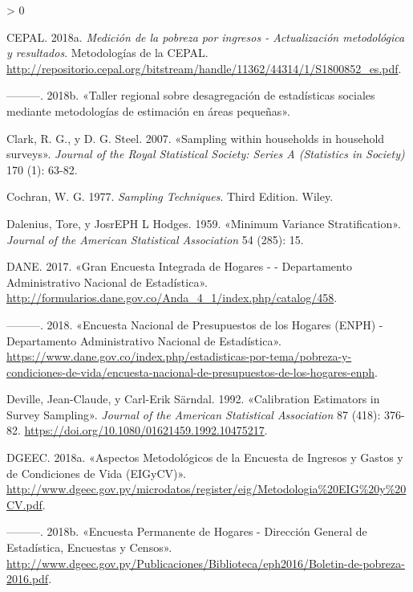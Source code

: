 \documentclass[
  12pt,
  spanish,
]{book}
\newlength{\cslhangindent}
\newenvironment{CSLReferences}[2] %
 {%
  \setlength{\parindent}{0pt}
  \ifodd #1 \everypar{\setlength{\hangindent}{\cslhangindent}}\ignorespaces\fi
  \ifnum #2 > 0
  \setlength{\parskip}{#2\baselineskip}
  \fi
 }%
 {}
\begin{document}
\begin{CSLReferences}{1}{0}
\leavevmode\hypertarget{ref-CEPAL_2018}{}%
CEPAL. 2018a. \emph{Medición de la pobreza por ingresos - Actualización metodológica y resultados}. Metodologías de la CEPAL. \url{http://repositorio.cepal.org/bitstream/handle/11362/44314/1/S1800852_es.pdf}.

\leavevmode\hypertarget{ref-CepalSAe2018}{}%
---------. 2018b. {«Taller regional sobre desagregación de estadísticas sociales mediante metodologías de estimación en áreas pequeñas»}.

\leavevmode\hypertarget{ref-Clark_Steel_2007}{}%
Clark, R. G., y D. G. Steel. 2007. {«Sampling within households in household surveys»}. \emph{Journal of the Royal Statistical Society: Series A (Statistics in Society)} 170 (1): 63-82.

\leavevmode\hypertarget{ref-Cochran_1977}{}%
Cochran, W. G. 1977. \emph{Sampling Techniques}. Third Edition. Wiley.

\leavevmode\hypertarget{ref-Dalenius_Hodges_1959}{}%
Dalenius, Tore, y JosrEPH L Hodges. 1959. {«Minimum Variance Stratification»}. \emph{Journal of the American Statistical Association} 54 (285): 15.

\leavevmode\hypertarget{ref-DANE-COL_2017}{}%
DANE. 2017. {«Gran Encuesta Integrada de Hogares - - Departamento Administrativo Nacional de Estadística»}. \url{http://formularios.dane.gov.co/Anda_4_1/index.php/catalog/458}.

\leavevmode\hypertarget{ref-DANE-COL_2018}{}%
---------. 2018. {«Encuesta Nacional de Presupuestos de los Hogares (ENPH) - Departamento Administrativo Nacional de Estadística»}. \url{https://www.dane.gov.co/index.php/estadisticas-por-tema/pobreza-y-condiciones-de-vida/encuesta-nacional-de-presupuestos-de-los-hogares-enph}.

\leavevmode\hypertarget{ref-Deville_Sarndal_1992}{}%
Deville, Jean-Claude, y Carl-Erik Särndal. 1992. {«Calibration Estimators in Survey Sampling»}. \emph{Journal of the American Statistical Association} 87 (418): 376-82. \url{https://doi.org/10.1080/01621459.1992.10475217}.

\leavevmode\hypertarget{ref-DGEEC2-PY}{}%
DGEEC. 2018a. {«Aspectos Metodológicos de la Encuesta de Ingresos y Gastos y de Condiciones de Vida (EIGyCV)»}. \url{http://www.dgeec.gov.py/microdatos/register/eig/Metodologia\%20EIG\%20y\%20CV.pdf}.

\leavevmode\hypertarget{ref-DGEEC-PY}{}%
---------. 2018b. {«Encuesta Permanente de Hogares - Dirección General de Estadística, Encuestas y Censos»}. \url{http://www.dgeec.gov.py/Publicaciones/Biblioteca/eph2016/Boletin-de-pobreza-2016.pdf}.


\end{CSLReferences}
\end{document}
